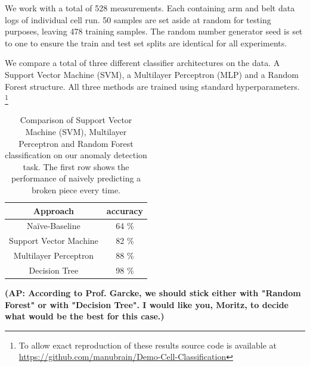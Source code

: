 \documentclass[5p,times,procedia]{elsarticle}
\newcommand{\AP}[1]{{\color{blue} {\bf (AP: #1)}}}
\begin{document}
We work with a total of 528 measurements. Each containing arm and belt data
logs of individual cell run. 50 samples are set aside at random for testing 
purposes, leaving 478 training samples. The random number generator seed is
set to one to ensure the train and test set splits are identical 
for all experiments.

We compare a total of three different classifier architectures on the data.
A Support Vector Machine (SVM), a Multilayer Perceptron (MLP) and a Random Forest
structure. All three methods are trained using standard hyperparameters.
\footnote{To allow exact reproduction of these results source
code is available at \url{https://github.com/manubrain/Demo-Cell-Classification}}

\begin{table}
       \centering
       \begin{tabular}{ c c } \toprule
              Approach         & accuracy \\ \midrule
              Na\"ive-Baseline & 64 \% \\
              Support Vector Machine & 82 \% \\
              Multilayer Perceptron & 88 \% \\
              Decision Tree         & 98 \% \\ \bottomrule
       \end{tabular}
       \caption{Comparison of Support Vector Machine (SVM), Multilayer Perceptron and 
                Random Forest classification on our anomaly detection task. 
                The first row shows the performance of naively predicting a broken piece
                every time.}
       \label{tab:class_comp}
\end{table}

\AP{According to Prof. Garcke, we should stick either with "Random Forest" or with "Decision Tree". I would like you, Moritz, to decide what would be the best for this case.}
\end{document}
